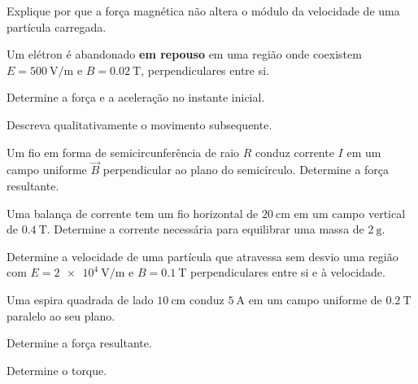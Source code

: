 \begin{questao}[2]{}

Explique por que a força magnética não altera o módulo da velocidade de uma
partícula carregada.


\end{questao}
\begin{questao}[2]{}

Um elétron é abandonado \textbf{em repouso} em uma região onde coexistem
$E=\SI{500}{\volt\per\meter}$ e $B=\SI{0.02}{\tesla}$, perpendiculares entre
si.
\begin{itensq}
\item Determine a força e a aceleração no instante inicial.
\item Descreva qualitativamente o movimento subsequente.
\end{itensq}


\end{questao}
\begin{questao}[2]{}

Um fio em forma de semicircunferência de raio $R$ conduz corrente $I$ em um
campo uniforme $\vec B$ perpendicular ao plano do semicírculo. Determine a
força resultante.


\end{questao}
\begin{questao}[2]{}

Uma balança de corrente tem um fio horizontal de $\SI{20}{\centi\meter}$ em um
campo vertical de $\SI{0.4}{\tesla}$. Determine a corrente necessária para
equilibrar uma massa de $\SI{2}{\gram}$.


\end{questao}
\begin{questao}[2]{}

Determine a velocidade de uma partícula que atravessa sem desvio uma região com
$E=\SI{2e4}{\volt\per\meter}$ e $B=\SI{0.1}{\tesla}$ perpendiculares entre si
e à velocidade.


\end{questao}
\begin{questao}[2]{}

Uma espira quadrada de lado $\SI{10}{\centi\meter}$ conduz $\SI{5}{\ampere}$
em um campo uniforme de $\SI{0.2}{\tesla}$ paralelo ao seu plano.
\begin{itensq}
\item Determine a força resultante.
\item Determine o torque.
\end{itensq}


\end{questao}

